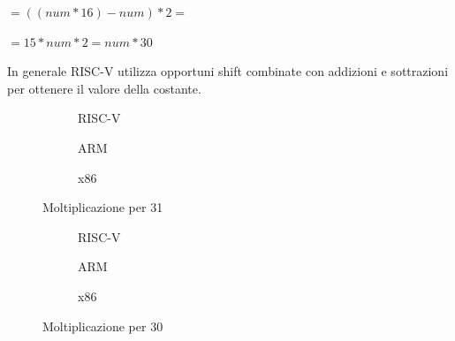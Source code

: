 \documentclass[12pt,a4paper]{report}
\begin{document}
$ =((num * 16 ) - num ) * 2 =$ 

$ = 15 * num * 2 =  num *30 $ 

\vspace{0.2 cm}
In generale RISC-V utilizza opportuni shift combinate con addizioni e sottrazioni per ottenere il valore della costante.

\begin{figure}[h]

     \begin{subfigure}[b]{0.3\textwidth}
  
        
        \label{Code:Mul31RISC}
	\caption{RISC-V}

     \end{subfigure}
     \hfill
     \begin{subfigure}[b]{0.3\textwidth}
         
          	
		\caption{ARM}
		 \label{Code:Mul31ARM}
     \end{subfigure}
     \hfill
     \begin{subfigure}[b]{0.3\textwidth}
         
          
	 \caption{x86}
	 \label{Code:Mul31X86}
     \end{subfigure}
     \caption{Moltiplicazione per 31}
     \end{figure}

\begin{figure}

     \begin{subfigure}[b]{0.3\textwidth}
  
        
         \label{Code:Mul30RISC}
	\caption{RISC-V}

     \end{subfigure}
     \hfill
     \begin{subfigure}[b]{0.3\textwidth}
         
          	
		\caption{ARM}
		 \label{Code:Mul30ARM}
     \end{subfigure}
     \hfill
     \begin{subfigure}[b]{0.3\textwidth}
         
          
	 \caption{x86}
	 \label{Code:Mul30X86}
     \end{subfigure}
     \caption{Moltiplicazione per 30}
     \end{figure}
\end{document}
